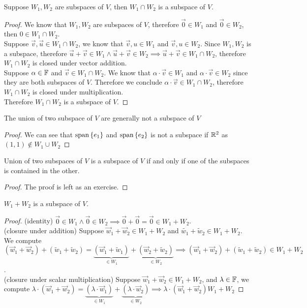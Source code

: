 \begin{theorem}
    Suppose $W_1,W_2$ are subspaces of $V$, then $W_1 \cap W_2$ is a subspace of $V$.
\end{theorem}
\begin{proof}
    We know that $W_1,W_2$ are subspaces of $V$, therefore $\vec 0 \in W_1$ and $\vec 0 \in W_2$, then $0 \in W_1 \cap W_2$. \\
    Suppose $\vec v,\vec u \in W_1 \cap W_2$, we know that $\vec v,u \in W_1$ and $\vec v,u \in W_2$. Since $W_1,W_2$ is a subspace, therefore $\vec u + \vec v \in W_1 \land \vec u + \vec v \in W_2 \implies \vec u + \vec v \in W_1 \cap W_2$, therefore $W_1 \cap W_2$ is closed under vector addition. \\ 
    Suppose $\alpha \in \mathbb F$ and $\vec v \in W_1 \cap W_2$. We know that $\alpha \cdot \vec v \in W_1$ and $\alpha \cdot \vec v \in W_2$ since they are both subspaces of $V$. Therefore we conclude $\alpha \cdot \vec v \in W_1 \cap W_2$, therefore $W_1 \cap W_2$ is closed under multiplication. \\
    Therefore $W_1 \cap W_2$ is a subspace of $V$.
\end{proof}
\begin{proposition}
    The union of two subspace of $V$ are generally not a subspace of $V$
\end{proposition}
\begin{proof}
    We can see that $\text{span} \left\{ e_1 \right\}$ and $\text{span} \left\{ e_2 \right\}$ is not a subspace if $\mathbb R^2$ as $(1,1) \not\in W_1 \cup W_2$ 
\end{proof}
\begin{theorem}
    Union of two subspaces of $V$ is a subspace of $V$ if and only if one of the subspaces is contained in the other.
\end{theorem}
\begin{proof}
    The proof is left as an exercise.
\end{proof}
\begin{theorem}
    $W_1 + W_2$ is a subspace of $V$.
\end{theorem}
\begin{proof}
    (identity) $\vec 0 \in W_1 \land \vec 0 \in W_2 \implies \vec 0 + \vec 0 = \vec 0 \in W_1 + W_2$. \\
    (closure under addition) Suppose $\vec w_1 + \vec w_2 \in W_1 + W_2$ and $\tilde {w_1} + \tilde  w_2 \in W_1 + W_2$. We compute $(\vec w_1 + \vec w_2) + (\tilde  w_1 + \tilde  w_2) = \underbrace{(\vec w_1 + \tilde  w_1)}_{\in W_1} + \underbrace{(\vec w_2 + \tilde  w_2)}_{\in W_2} \implies (\vec w_1 + \vec w_2) + (\tilde  w_1 + \tilde  w_2) \in W_1 + W_2$. \\
    (closure under scalar multiplication) Suppose $\vec w_1 + \vec w_2 \in W_1 + W_2$, and $\lambda \in \mathbb F$, we compute $\lambda \cdot (\vec w_1 + \vec w_2)  = \underbrace{(\lambda \cdot \vec w_1)}_{\in W_1} + \underbrace{(\lambda \cdot \vec w_2)}_{\in W_2} \implies \lambda \cdot (\vec w_1 + \vec w_2) W_1 + W_2$
\end{proof}
